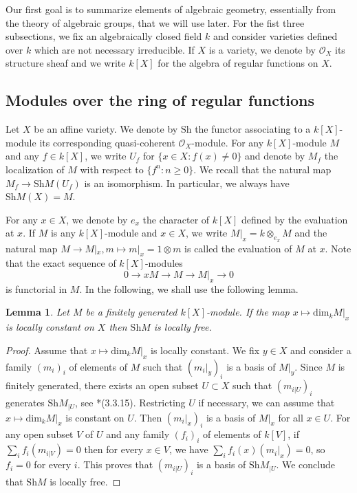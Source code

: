 \documentclass{amsart}
\newtheorem{lemma}[theorem]{Lemma}
\theoremstyle{definition}
\begin{document}
Our first goal is to summarize elements of algebraic geometry, essentially from the theory of algebraic groups, that we will use later. For the fist three subsections, we fix an algebraically closed field $k$ and consider varieties defined over $k$ which are not necessary irreducible.  If $X$ is a variety, we denote by $\mathscr{O}_X$ its structure sheaf and we write $k[X]$ for the algebra of regular functions on $X$.

\subsection{Modules over the ring of regular functions}

Let $X$ be an affine variety. We denote by $\mathrm{Sh}$ the functor associating to a $k[X]$-module its corresponding quasi-coherent $\mathscr{O}_X$-module. For any $k[X]$-module $M$ and any $f \in k[X]$, we write $U_f$ for $\{ x \in X : f(x) \neq 0 \}$ and denote by $M_f$ the localization of $M$ with respect to $\{f^n : n \geq 0\}$. We recall that the natural map $M_f \to \mathrm{Sh}M(U_f)$ is an isomorphism. In particular, we always have $\mathrm{Sh} M (X) = M$.

For any $x \in X$, we denote by $e_x$ the character of $k[X]$ defined by the evaluation at $x$. If $M$ is any $k[X]$-module and $x \in X$, we write $M|_x= k \otimes_{e_x} M$ and the natural map $M \to M|_x, m \mapsto m|_x = 1 \otimes m$ is called the evaluation of $M$ at $x$. Note that the exact sequence of $k[X]$-modules
$$0 \to x M \to M \to M|_x \to 0$$
is functorial in $M$. In the following, we shall use the following lemma.

\begin{lemma} \label{free}
Let $M$ be a finitely generated $k[X]$-module. If the map $x \mapsto \mathrm{dim}_k M|_x$ is locally constant on $X$ then $\mathrm{Sh}M$ is locally free.
\end{lemma}

\begin{proof}
    Assume that $x \mapsto \mathrm{dim}_k M|_x$ is locally constant. We fix $y \in X$ and consider a family $(m_i)_i$ of elements of $M$ such that $(m_i|_y)_i$ is a basis of $M|_y$. Since $M$ is finitely generated, there exists an open subset $U \subset X$ such that $(m_{i|U})_i$ generates $\mathrm{Sh}M_{|U}$, see \cite{Ducros}*{(3.3.15)}. Restricting $U$ if necessary, we can assume that $x \mapsto \mathrm{dim}_k M|_x$ is constant on $U$. Then $(m_i|_x)_i$ is a basis of $M|_x$ for all $x \in U$. For any open subset $V$ of $U$ and any family $(f_i)_i$ of elements of $k[V]$, if $\sum_i f_i (m_{i|V}) = 0$ then for every $x \in V$, we have $\sum_i f_i(x) (m_i|_x) = 0$, so $f_i= 0$ for every $i$. This proves that $(m_{i|U})_i$ is a basis of $\mathrm{Sh}M_{|U}$. We conclude that $\mathrm{Sh}M$ is locally free.
\end{proof}
\end{document}
